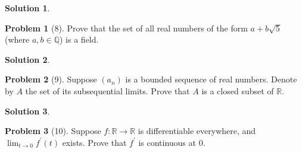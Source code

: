 \documentclass[12pt]{article}
\theoremstyle{definition} %
\newtheorem{solution}{Solution}
\newtheorem{problem}{Problem}
\theoremstyle{plain} %
\begin{document}
\begin{solution}
    
\end{solution}
\begin{problem}[8]
    Prove that the set of all real numbers of the form $a+b\sqrt{5} $ (where $a,b \in \mathbb{{Q}}$) is a field.   
\end{problem}
\begin{solution}
    
\end{solution}
\begin{problem}[9] 
    Suppose $(a_{n})$ is a bounded sequence of real numbers. Denote by $A$ the set of its subsequential limits. Prove that $A$ is a closed subset of $\mathbb{{R}}$.  
\end{problem}
\begin{solution}
    
\end{solution}
\begin{problem}[10]
    Suppose $f:\mathbb{{R}}\to \mathbb{{R}}$ is differentiable everywhere, and $\lim_{t \to 0} f^\prime (t)$ exists. Prove that $f^\prime$ is continuous at $0$.    
\end{problem}
\end{document}
